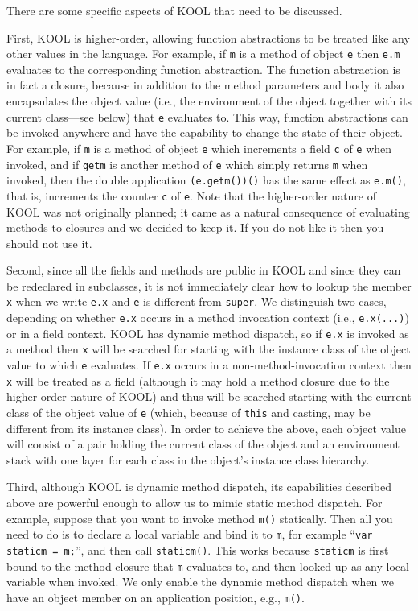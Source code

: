 \begin{latexComment}
There are some specific aspects of KOOL that need to be discussed.

First, KOOL is higher-order, allowing function abstractions to be
treated like any other values in the language.  For example, if
\texttt{m} is a method of object \texttt{e} then \texttt{e.m}
evaluates to the corresponding function abstraction.  The function
abstraction is in fact a closure, because in addition to the method
parameters and body it also encapsulates the object value (i.e., the
environment of the object together with its current class---see below)
that \texttt{e} evaluates to.  This way, function abstractions can be
invoked anywhere and have the capability to change the state of their
object.  For example, if \texttt{m} is a method of object \texttt{e}
which increments a field \texttt{c} of \texttt{e} when invoked, and if
\texttt{getm} is another method of \texttt{e} which simply returns
\texttt{m} when invoked, then the double application
\texttt{(e.getm())()} has the same effect as \texttt{e.m()}, that is,
increments the counter \texttt{c} of \texttt{e}.  Note that the
higher-order nature of KOOL was not originally planned; it came as a
natural consequence of evaluating methods to closures and we decided
to keep it.  If you do not like it then you should not use it.

Second, since all the fields and methods are public in KOOL and since
they can be redeclared in subclasses, it is not immediately clear how
to lookup the member \texttt{x} when we write \texttt{e.x} and
\texttt{e} is different from \texttt{super}.  We distinguish two cases,
depending on whether \texttt{e.x} occurs in a method invocation
context (i.e., \texttt{e.x(...)}) or in a field context.  KOOL has
dynamic method dispatch, so if \texttt{e.x} is invoked as a method
then \texttt{x} will be searched for starting with the instance class of
the object value to which \texttt{e} evaluates.  If \texttt{e.x}
occurs in a non-method-invocation context then \texttt{x} will be
treated as a field (although it may hold a method closure due to the
higher-order nature of KOOL) and thus will be searched starting with
the current class of the object value of \texttt{e} (which, because of
\texttt{this} and casting, may be different from its instance class).
In order to achieve the above, each object value will consist of a
pair holding the current class of the object and an environment stack
with one layer for each class in the object's instance class hierarchy.

Third, although KOOL is dynamic method dispatch, its capabilities
described above are powerful enough to allow us to mimic static
method dispatch.  For example, suppose that you want to invoke method
\texttt{m()} statically.  Then all you need to do is to declare a
local variable and bind it to \texttt{m}, for example ``\texttt{var
staticm = m;}'', and then call \texttt{staticm()}.  This works because
\texttt{staticm} is first bound to the method closure that \texttt{m}
evaluates to, and then looked up as any local variable when invoked.
We only enable the dynamic method dispatch when we have an object
member on an application position, e.g., \texttt{m()}.


\end{latexComment}
